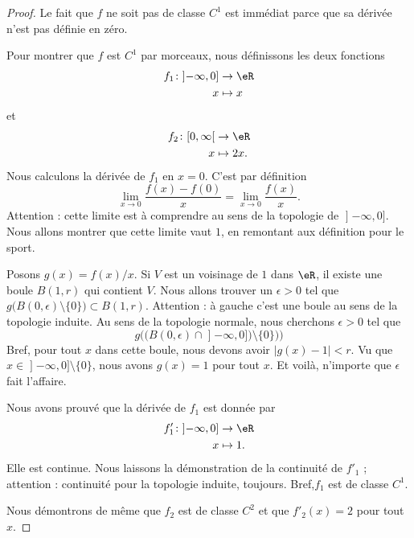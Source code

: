 \begin{proof}
	Le fait que \( f\) ne soit pas de classe \( C^1\) est immédiat parce que sa dérivée n'est pas définie en zéro.

	Pour montrer que \( f\) est \( C^1\) par morceaux, nous définissons les deux fonctions
	\begin{equation}
		\begin{aligned}
			f_1\colon \mathopen] -\infty,0\mathclose] & \to \eR   \\
			x                                         & \mapsto x
		\end{aligned}
	\end{equation}
	et
	\begin{equation}
		\begin{aligned}
			f_2\colon \mathopen[ 0,\infty\mathclose[ & \to \eR     \\
			x                                        & \mapsto 2x.
		\end{aligned}
	\end{equation}
	Nous calculons la dérivée de \( f_1\) en \( x=0\). C'est par définition
	\begin{equation}
		\lim_{x\to 0} \frac{ f(x)-f(0) }{ x }=\lim_{x\to 0} \frac{ f(x) }{ x }.
	\end{equation}
	Attention : cette limite est à comprendre au sens de la topologie de \( \mathopen] -\infty,0\mathclose]\). Nous allons montrer que cette limite vaut \( 1\), en remontant aux définition pour le sport.

	Posons \( g(x)=f(x)/x\). Si \( V\) est un voisinage de \( 1\) dans \( \eR\), il existe une boule \( B(1,r)\) qui contient \( V\). Nous allons trouver un \( \epsilon>0\) tel que \( g\big( B(0,\epsilon)\setminus \{ 0 \} \big)\subset B(1,r)\). Attention : à gauche c'est une boule au sens de la topologie induite. Au sens de la topologie normale, nous cherchons \( \epsilon>0\) tel que
	\begin{equation}
		g\Big(\big( B(0,\epsilon)\cap\mathopen] -\infty,0\mathclose] \big)\setminus\{ 0 \})\Big)
	\end{equation}
	Bref, pour tout \( x\) dans cette boule, nous devons avoir \(  | g(x)-1 |<r  \). Vu que \( x\in\mathopen] -\infty,0\mathclose]\setminus\{ 0 \}\), nous avons \( g(x)=1\) pour tout \( x\). Et voilà, n'importe que \( \epsilon\) fait l'affaire.

	Nous avons prouvé que la dérivée de \( f_1\) est donnée par
	\begin{equation}
		\begin{aligned}
			f_1'\colon \mathopen] -\infty,0\mathclose] & \to \eR    \\
			x                                          & \mapsto 1.
		\end{aligned}
	\end{equation}
	Elle est continue. Nous laissons la démonstration de la continuité de \( f'_1\) ; attention : continuité pour la topologie induite, toujours. Bref,\( f_1\) est de classe \( C^1\).

	Nous démontrons de même que \( f_2\) est de classe \( C^2\) et que \( f'_2(x)=2\) pour tout \( x\).
\end{proof}

